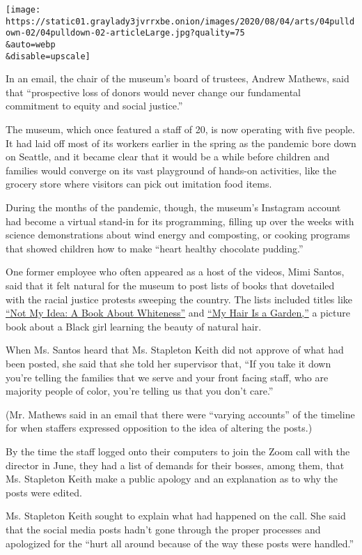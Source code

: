 \texttt{[image: https://static01.graylady3jvrrxbe.onion/images/2020/08/04/arts/04pulldown-02/04pulldown-02-articleLarge.jpg?quality=75\\\&auto=webp\\\&disable=upscale]}

In an email, the chair of the museum's board of trustees, Andrew
Mathews, said that ``prospective loss of donors would never change our
fundamental commitment to equity and social justice.''

The museum, which once featured a staff of 20, is now operating with
five people. It had laid off most of its workers earlier in the spring
as the pandemic bore down on Seattle, and it became clear that it would
be a while before children and families would converge on its vast
playground of hands-on activities, like the grocery store where visitors
can pick out imitation food items.

During the months of the pandemic, though, the museum's Instagram
account had become a virtual stand-in for its programming, filling up
over the weeks with science demonstrations about wind energy and
composting, or cooking programs that showed children how to make ``heart
healthy chocolate pudding.''

One former employee who often appeared as a host of the videos, Mimi
Santos, said that it felt natural for the museum to post lists of books
that dovetailed with the racial justice protests sweeping the country.
The lists included titles like
\href{https://anastasiahigginbotham.com/not-my-idea/}{``Not My Idea: A
Book About Whiteness''} and
\href{https://www.albertwhitman.com/book/my-hair-is-a-garden/}{``My Hair
Is a Garden,''} a picture book about a Black girl learning the beauty of
natural hair.

When Ms. Santos heard that Ms. Stapleton Keith did not approve of what
had been posted, she said that she told her supervisor that, ``If you
take it down you're telling the families that we serve and your front
facing staff, who are majority people of color, you're telling us that
you don't care.''

(Mr. Mathews said in an email that there were ``varying accounts'' of
the timeline for when staffers expressed opposition to the idea of
altering the posts.)

By the time the staff logged onto their computers to join the Zoom call
with the director in June, they had a list of demands for their bosses,
among them, that Ms. Stapleton Keith make a public apology and an
explanation as to why the posts were edited.

Ms. Stapleton Keith sought to explain what had happened on the call. She
said that the social media posts hadn't gone through the proper
processes and apologized for the ``hurt all around because of the way
these posts were handled.''


